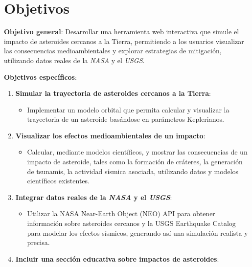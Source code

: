 \documentclass[conference]{IEEEtran}
\begin{document}
\section{Objetivos}

\textbf{Objetivo general}: Desarrollar una herramienta web interactiva que
simule el impacto de asteroides cercanos a la Tierra, permitiendo a los usuarios
visualizar las consecuencias medioambientales y explorar estrategias de
mitigación, utilizando datos reales de la \textit{NASA} y el \textit{USGS}.

\textbf{Objetivos específicos}:
\begin{enumerate}
	\item \textbf{Simular la trayectoria de asteroides cercanos a la Tierra}:
	      \begin{itemize}
		      \item{ Implementar un modelo orbital que permita calcular y
		            visualizar la trayectoria de un asteroide basándose en
		            parámetros Keplerianos.}
	      \end{itemize}

	\item \textbf{Visualizar los efectos medioambientales de un impacto}:
	      \begin{itemize}
		      \item{Calcular, mediante modelos científicos, y mostrar las
		            consecuencias de un impacto de asteroide, tales como la
		            formación de cráteres, la generación de tsunamis, la actividad
		            sísmica asociada, utilizando datos y modelos científicos existentes.}
	      \end{itemize}

	\item \textbf{Integrar datos reales de la \textit{NASA} y el \textit{USGS}}:
	      \begin{itemize}
		      \item{Utilizar la NASA Near-Earth Object (NEO) API para obtener
		            información sobre asteroides cercanos y la USGS Earthquake
		            Catalog para modelar los efectos sísmicos, generando así una
		            simulación realista y precisa.}
	      \end{itemize}

	\item \textbf{Incluir una sección educativa sobre impactos de asteroides}:
	      \begin{itemize}


\end{itemize}
\end{enumerate}
\end{document}

